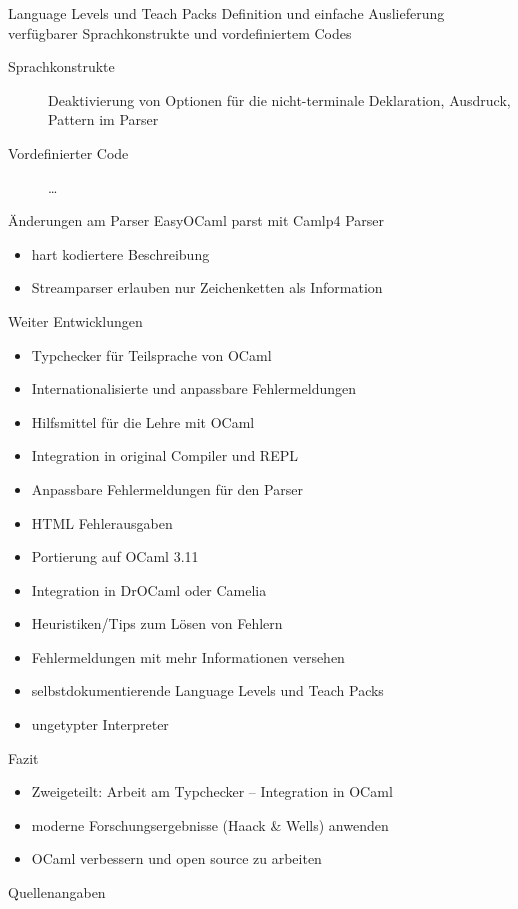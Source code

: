\documentclass{beamer}
\begin{document}
\begin{frame}{Language Levels und Teach Packs}
  Definition und einfache Auslieferung verfügbarer Sprachkonstrukte und
  vordefiniertem Codes
  \begin{description}
    \item[Sprachkonstrukte] Deaktivierung von Optionen für die nicht-terminale Deklaration, Ausdruck, Pattern im Parser
    \item[Vordefinierter Code] \ldots
  \end{description}
\end{frame}

\begin{frame}{Änderungen am Parser}
  EasyOCaml parst mit Camlp4 Parser
  \begin{itemize}
    \item hart kodiertere Beschreibung
    \item Streamparser erlauben nur Zeichenketten als Information
  \end{itemize}
\end{frame}

\begin{frame}{Weiter Entwicklungen}
  \begin{itemize}
    \item[\checkmark] Typchecker für Teilsprache von OCaml
    \item[\checkmark] Internationalisierte und anpassbare Fehlermeldungen
    \item[\checkmark] Hilfsmittel für die Lehre mit OCaml
    \item[\checkmark] Integration in original Compiler und REPL
    \item[\checkmark] Anpassbare Fehlermeldungen für den Parser
    \item[\checkmark] HTML Fehlerausgaben
    \item[\checkmark] Portierung auf OCaml 3.11
    \item Integration in DrOCaml oder Camelia
    \item Heuristiken/Tips zum Lösen von Fehlern
    \item Fehlermeldungen mit mehr Informationen versehen
    \item selbstdokumentierende Language Levels und Teach Packs
    \item ungetypter Interpreter
  \end{itemize}
\end{frame}

\begin{frame}{Fazit}
  \begin{itemize}
  \end{itemize}
  \begin{itemize}
    \item Zweigeteilt: Arbeit am Typchecker -- Integration in OCaml
    \item moderne Forschungsergebnisse (Haack \& Wells) anwenden
    \item OCaml verbessern und open source zu arbeiten
  \end{itemize}
\end{frame}

\begin{frame}{Quellenangaben}
  
  \clearpage
\end{frame}
\end{document}
